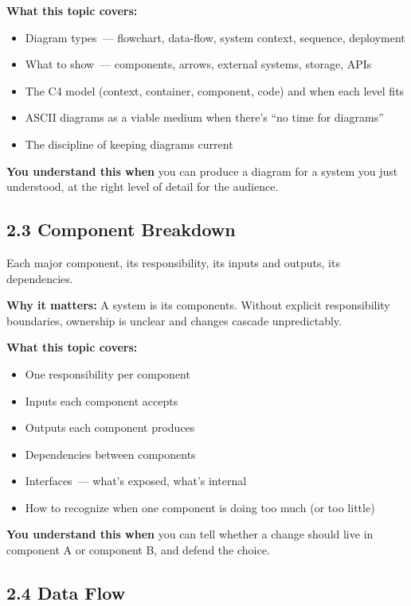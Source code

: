 \textbf{What this topic covers:}

\begin{itemize}
\tightlist
\item
  Diagram types~--- flowchart, data-flow, system context, sequence, deployment
\item
  What to show~--- components, arrows, external systems, storage, APIs
\item
  The C4 model (context, container, component, code) and when each level fits
\item
  ASCII diagrams as a viable medium when there's ``no time for diagrams''
\item
  The discipline of keeping diagrams current
\end{itemize}

\noindent{}\textbf{You understand this when} you can produce a diagram for a system you just understood, at the right level of detail for the audience.

\subsection*{2.3 Component Breakdown}\label{project-planning-guide:23-component-breakdown}

Each major component, its responsibility, its inputs and outputs, its dependencies.

\textbf{Why it matters:} A system is its components. Without explicit responsibility boundaries, ownership is unclear and changes cascade unpredictably.

\textbf{What this topic covers:}

\begin{itemize}
\tightlist
\item
  One responsibility per component
\item
  Inputs each component accepts
\item
  Outputs each component produces
\item
  Dependencies between components
\item
  Interfaces~--- what's exposed, what's internal
\item
  How to recognize when one component is doing too much (or too little)
\end{itemize}

\noindent{}\textbf{You understand this when} you can tell whether a change should live in component A or component B, and defend the choice.

\subsection*{2.4 Data Flow}\label{project-planning-guide:24-data-flow}

